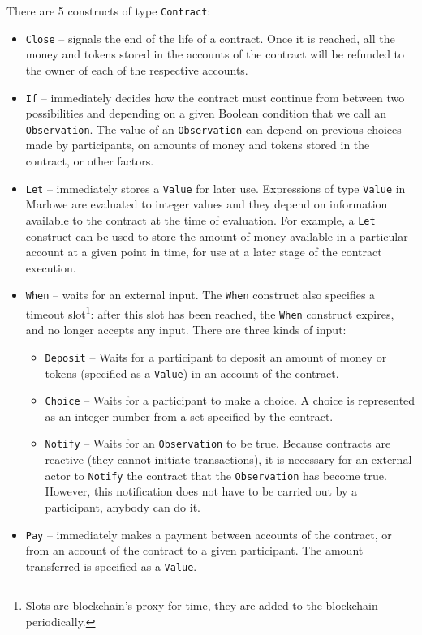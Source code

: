\documentclass[english,runningheads]{llncs}
\begin{document}
There are 5 constructs of type \texttt{Contract}:
\begin{itemize}
\item \texttt{Close} -- signals the end of the life of a contract. Once
it is reached, all the money and tokens stored in the accounts of
the contract will be refunded to the owner of each of the respective
accounts.
\item \texttt{If} -- immediately decides how the contract must continue
from between two possibilities and depending on a given Boolean condition
that we call an \texttt{Observation}. The value of an \texttt{Observation}
can depend on previous choices made by participants, on amounts of money
and tokens stored in the contract, or other factors.
\item \texttt{Let} -- immediately stores a \texttt{Value} for later use.
Expressions of type \texttt{Value} in Marlowe are evaluated to integer
values and they depend on information available to the contract at the
time of evaluation. For example, a \texttt{Let} construct can be used to
store the amount of money available in a particular account at a given point
in time, for use at a later stage of the contract execution.
\item \texttt{When} -- waits for an external input. The \texttt{When} construct
also specifies a timeout slot\footnote{Slots are blockchain's proxy for time,
they are added to the blockchain periodically.}: after this slot has been reached, the
\texttt{When} construct expires, and no longer accepts any input.
There are three kinds of input:
\begin{itemize}
\item \texttt{Deposit} -- Waits for a participant to deposit an amount
of money or tokens (specified as a \texttt{Value}) in an account of the contract.
\item \texttt{Choice} -- Waits for a participant to make a choice. A choice
is represented as an integer number from a set specified by the contract.
\item \texttt{Notify} -- Waits for an \texttt{Observation} to be true.
Because contracts are reactive (they cannot initiate transactions),
it is necessary for an external actor to \texttt{Notify} the contract
that the \texttt{Observation} has become true. However, this notification
does not have to be carried out by a participant, anybody can do it.
\end{itemize}
\item \texttt{Pay} -- immediately makes a payment between accounts of the
contract, or from an account of the contract to a given participant.
The amount transferred is specified as a \texttt{Value}.
\end{itemize}
\end{document}
